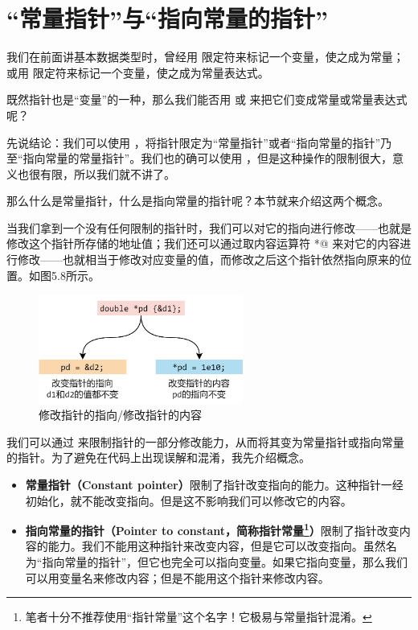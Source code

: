 \section{``常量指针''与``指向常量的指针''}
我们在前面讲基本数据类型时，曾经用 \lstinline@const@ 限定符来标记一个变量，使之成为常量；或用 \lstinline@constexpr@ 限定符来标记一个变量，使之成为常量表达式。\par
既然指针也是``变量''的一种，那么我们能否用 \lstinline@const@ 或 \lstinline@constexpr@ 来把它们变成常量或常量表达式呢？\par
先说结论：我们可以使用 \lstinline@const@，将指针限定为``常量指针''或者``指向常量的指针''乃至``指向常量的常量指针''。我们也的确可以使用 \lstinline@constexpr@，但是这种操作的限制很大，意义也很有限，所以我们就不讲了。\par
那么什么是常量指针，什么是指向常量的指针呢？本节就来介绍这两个概念。\par
当我们拿到一个没有任何限制的指针时，我们可以对它的指向进行修改——也就是修改这个指针所存储的地址值；我们还可以通过取内容运算符 \lstinline@*@ 来对它的内容进行修改——也就相当于修改对应变量的值，而修改之后这个指针依然指向原来的位置。如图5.8所示。\par
\begin{figure}[htbp]
    \centering
    \includegraphics[width=0.6\textwidth]{../images/generalized_parts/05_change_pointer_s_address_or_content.drawio.png}
    \caption{修改指针的指向/修改指针的内容}
\end{figure}
我们可以通过 \lstinline@const@ 来限制指针的一部分修改能力，从而将其变为常量指针或指向常量的指针。为了避免在代码上出现误解和混淆，我先介绍概念。\par
\begin{itemize}
    \item \textbf{常量指针（Constant pointer）}限制了指针改变指向的能力。这种指针一经初始化，就不能改变指向。但是这不影响我们可以修改它的内容。
    \item \textbf{指向常量的指针（Pointer to constant，简称指针常量\footnote{笔者十分不推荐使用``指针常量''这个名字！它极易与常量指针混淆。}）}限制了指针改变内容的能力。我们不能用这种指针来改变内容，但是它可以改变指向。虽然名为``指向常量的指针''，但它也完全可以指向变量。如果它指向变量，那么我们可以用变量名来修改内容；但是不能用这个指针来修改内容。
\end{itemize}\par
